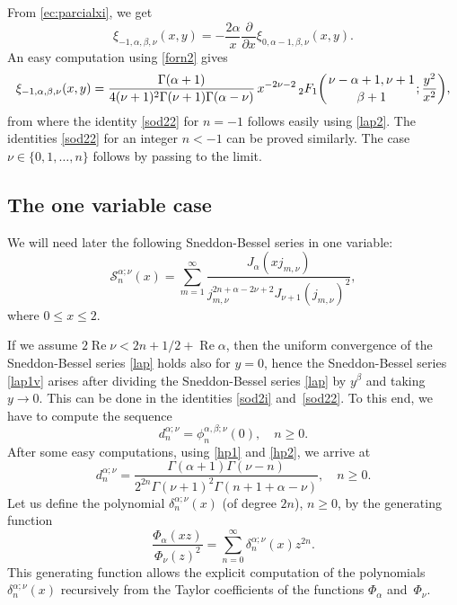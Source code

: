 \documentclass[10pt,leqno,a4paper]{article}
\theoremstyle{plain}
\newcommand{\Ss}{\mathcal{S}}
\renewcommand{\Re}{\operatorname{Re}}
\numberwithin{equation}{section}
\newcommand{\FF}[3]{{}_{2}F_{1}%
  \mathopen{}\left(\genfrac{}{}{0pt}{}{#1}{#2};#3\right)\mathclose{}}
\begin{document}
From \eqref{ec:parcialxi}, we get
\[
   \xi_{-1,\alpha,\beta,\nu}(x,y)
   = - \frac{2\alpha}{x} \frac{\partial}{\partial x} \xi_{0,\alpha-1,\beta,\nu}(x,y).
\]
An easy computation using \eqref{forn2} gives
\[
   \xi_{-1,\alpha,\beta,\nu}(x,y)
   = \frac{\Gamma(\alpha+1)}{4(\nu+1)^2\Gamma(\nu+1)\Gamma(\alpha-\nu)}
   \, x^{-2\nu-2} \, \FF{\nu-\alpha+1,\nu+1}{\beta+1}{\frac{y^2}{x^2}},
\]
from where the identity \eqref{sod22} for $n=-1$ follows easily using \eqref{lap2}. The identities \eqref{sod22} for an integer $n < -1$ can be proved similarly. The case $\nu\in\{0,1,\dots, n\}$ follows by passing to the limit.

\subsection{The one variable case}
\label{unavariable}

We will need later the following Sneddon-Bessel series in one variable:
\begin{equation}
\label{lap1v}
   \Ss_n^{\alpha;\nu}(x)
   = \sum_{m=1}^\infty
   \frac{J_\alpha(x j_{m,\nu})}{j_{m,\nu}^{2n+\alpha-2\nu+2} J_{\nu+1}(j_{m,\nu})^2},
\end{equation}
where $0\leq x\leq 2$.

If we assume $2\Re\nu < 2n + 1/2 + \Re\alpha$, then the uniform convergence of the Sneddon-Bessel series \eqref{lap} holds also for $y=0$, hence the Sneddon-Bessel series \eqref{lap1v} arises after dividing the Sneddon-Bessel series \eqref{lap} by $y^\beta$ and taking $y\to 0$. This can be done in the identities \eqref{sod2i} and~\eqref{sod22}. To this end, we have to compute the sequence
\[
   d_n^{\alpha;\nu} = \phi_n^{\alpha,\beta;\nu}(0), \quad n\geq 0.
\]
After some easy computations, using \eqref{hp1} and \eqref{hp2}, we arrive at
\[
   d_n^{\alpha;\nu}
   = \frac{\Gamma(\alpha+1)\Gamma(\nu-n)}{2^{2n}\Gamma(\nu+1)^2 \Gamma(n+1+\alpha-\nu)},
   \quad n\geq 0.
\]
Let us define the polynomial $\delta_n^{\alpha;\nu}(x)$ (of degree $2n$), $n\geq 0$, by the generating function
\begin{equation}
\label{gna}
   \frac{\Phi_{\alpha}(xz)}{\Phi_\nu(z)^2}
   = \sum_{n=0}^\infty \delta_n^{\alpha;\nu}(x)z^{2n}.
\end{equation}
This generating function allows the explicit computation of the polynomials $\delta_n^{\alpha;\nu}(x)$ recursively from the Taylor coefficients of the functions $\Phi_\alpha$ and~$\Phi_\nu$.
\end{document}
